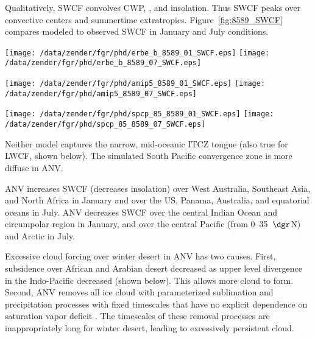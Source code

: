 \documentclass[agums]{aguplus}
\begin{document}
Qualitatively, SWCF convolves CWP, \rdsffc, and insolation.
Thus SWCF peaks over convective centers and summertime extratropics. 
Figure~\ref{fig:8589_SWCF} compares modeled to observed SWCF in
January and July conditions.
\begin{figure*}
\begin{center}
\texttt{[image: /data/zender/fgr/phd/erbe\_b\_8589\_01\_SWCF.eps]}%
\texttt{[image: /data/zender/fgr/phd/erbe\_b\_8589\_07\_SWCF.eps]}%

\texttt{[image: /data/zender/fgr/phd/amip5\_8589\_01\_SWCF.eps]}%
\texttt{[image: /data/zender/fgr/phd/amip5\_8589\_07\_SWCF.eps]}%

\texttt{[image: /data/zender/fgr/phd/spcp\_85\_8589\_01\_SWCF.eps]}%
\texttt{[image: /data/zender/fgr/phd/spcp\_85\_8589\_07\_SWCF.eps]}%
\end{center}
\caption[Geographic distribution of shortwave cloud forcing SWCF
for 1985--1989 January and July ERBE, CCM, and ANV]{
Geographic distribution of shortwave cloud forcing SWCF (\wxmS) for
1985--1989 January and July (a,b) ERBE, (c,d) CCM, and (e,f) ANV.  
\label{fig:8589_SWCF}}   
\end{figure*}
Neither model captures the narrow, mid-oceanic ITCZ tongue (also true
for LWCF, shown below).
The simulated South Pacific convergence zone is more diffuse in ANV.

ANV increases SWCF (decreases insolation) over West Australia,
Southeast Asia, and North Africa in January and over the US, Panama,
Australia, and equatorial oceans in July. 
ANV decreases SWCF over the central Indian Ocean and circumpolar
region in January, and over the central Pacific (from
0--35~$\dgr$N) and Arctic in July. 

Excessive cloud forcing over winter desert in ANV has two causes.
First, subsidence over African and Arabian desert decreased as upper
level divergence in the Indo-Pacific decreased (shown below).
This allows more cloud to form.
Second, ANV removes all ice cloud with parameterized sublimation and
precipitation processes with fixed timescales that have no explicit
dependence on saturation vapor deficit \cite[]{ZeK961}.
The timescales of these removal processes are inappropriately long for
winter desert, leading to excessively persistent cloud.
\end{document}
